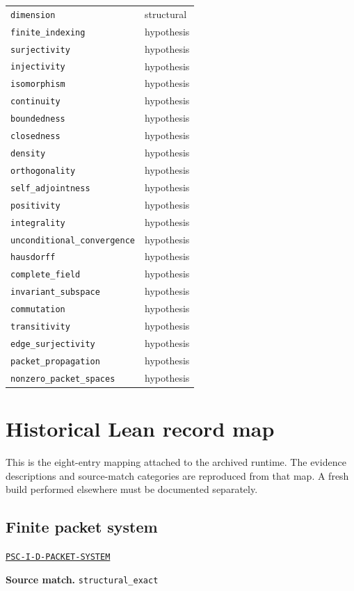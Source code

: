 \documentclass[a4paper,11pt]{article}
\newcommand{\field}[2]{\par\smallskip\noindent\textbf{#1.} #2\par}
\begin{document}
\begin{longtable}{@{}p{}p{}@{}}
\nolinkurl{dimension} & structural\\
\nolinkurl{finite_indexing} & hypothesis\\
\nolinkurl{surjectivity} & hypothesis\\
\nolinkurl{injectivity} & hypothesis\\
\nolinkurl{isomorphism} & hypothesis\\
\nolinkurl{continuity} & hypothesis\\
\nolinkurl{boundedness} & hypothesis\\
\nolinkurl{closedness} & hypothesis\\
\nolinkurl{density} & hypothesis\\
\nolinkurl{orthogonality} & hypothesis\\
\nolinkurl{self_adjointness} & hypothesis\\
\nolinkurl{positivity} & hypothesis\\
\nolinkurl{integrality} & hypothesis\\
\nolinkurl{unconditional_convergence} & hypothesis\\
\nolinkurl{hausdorff} & hypothesis\\
\nolinkurl{complete_field} & hypothesis\\
\nolinkurl{invariant_subspace} & hypothesis\\
\nolinkurl{commutation} & hypothesis\\
\nolinkurl{transitivity} & hypothesis\\
\nolinkurl{edge_surjectivity} & hypothesis\\
\nolinkurl{packet_propagation} & hypothesis\\
\nolinkurl{nonzero_packet_spaces} & hypothesis\\
\bottomrule\end{longtable}\clearpage\section{Historical Lean record map}
This is the eight-entry mapping attached to the archived runtime. The evidence descriptions and source-match categories are reproduced from that map. A fresh build performed elsewhere must be documented separately.
\subsection*{Finite packet system}
\hyperref[rec:PSC-I-D-PACKET-SYSTEM]{\nolinkurl{PSC-I-D-PACKET-SYSTEM}}
\field{Source match}{\nolinkurl{structural_exact}}
\end{document}
